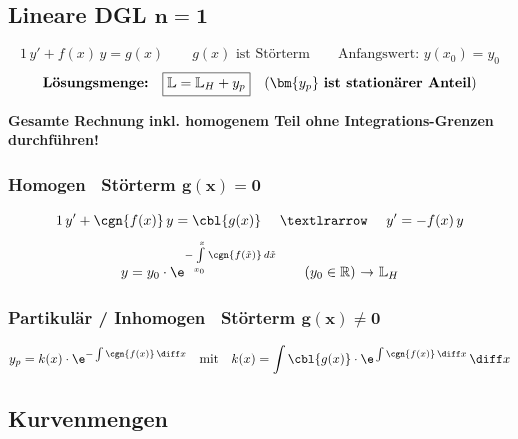 \subsection[Lineare DGL n=1]{Lineare DGL $\bm{n=1}$}\vspace{-0.3cm}

$$ 1 \, y' +  f(x) \, y = g(x) \qquad g(x) \text{ ist Störterm} \qquad \text{Anfangswert: } y(x_0) = y_0 $$
$$ \text{\textbf{Lösungsmenge:}} \quad \boxed{\mathbb{L} = \mathbb{L}_H + y_p} \quad (\bm{y_p} \text{ \textbf{ist stationärer Anteil}}) $$

\textbf{Gesamte Rechnung inkl. homogenem Teil ohne Integrations-Grenzen durchführen!}


\subsubsection{Homogen \textrightarrow\ Störterm $\bm{g(x) = 0}$}

\vspace{-0.2cm}

\[1 \, y' +  \cgn{f(x)} \, y = \cbl{g(x)} \quad \text{ \textlrarrow\ } \quad y' = -f(x) \, y  \]
\[y = y_0 \cdot \e^{- \int \limits_{x_0}^{x} \cgn{f(\tilde{x})} \, d\tilde{x}} \qquad 
(y_0 \in \mathbb{R}) \text{ \textrightarrow\ } \mathbb{L}_H\]


\subsubsection{Partikulär / Inhomogen \textrightarrow\ Störterm $\bm{g(x) \neq 0}$}\vspace{-0.2cm}

\[y_p = k(x) \cdot  \e^{- \int \cgn{f(x)} \, \diff x} \quad \text{mit} \quad k(x) 
= \int \cbl{g(x)} \cdot \e^{\, \int \cgn{f(x)} \, \diff x} \, \diff x\]


\subsection{Kurvenmengen}

